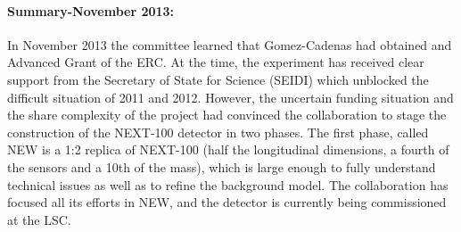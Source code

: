 \paragraph{Summary-November 2013:} In November 2013 the committee learned that Gomez-Cadenas had obtained and Advanced Grant of the ERC. At the time, the experiment has received clear support from the
Secretary of State for Science (SEIDI) which unblocked the difficult situation of 2011 and 2012. However, the uncertain funding situation and the share complexity of the project had convinced the collaboration to stage the construction of the NEXT-100 detector in two phases. The first phase, called NEW is a 1:2 replica of NEXT-100 (half the longitudinal dimensions, a fourth of the sensors and a 10th of the mass), which is large enough to fully understand technical issues as well as to refine the background model. The collaboration has focused all its efforts in NEW, and the detector is currently being commissioned at the LSC. 
